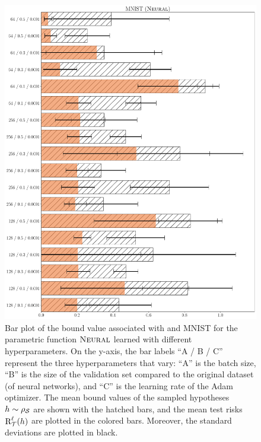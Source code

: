 \documentclass[twoside]{article}
\theoremstyle{plain}
\begin{document}
\begin{figure}
\centering
\includegraphics[width=0.9\linewidth]{figures/fig_7_mnist.pdf}
\caption{
Bar plot of the bound value associated with  and MNIST for the parametric function $\text{\sc Neural}$ learned with different hyperparameters.
On the y-axis, the bar labels ``A / B / C'' represent the three hyperparameters that vary: ``A'' is the batch size, ``B'' is the size of the validation set compared to the original dataset (of neural networks), and ``C'' is the learning rate of the Adam optimizer.
The mean bound values of the sampled hypotheses $h\sim\rho_{\mathcal{S}}$ are shown with the hatched bars, and the mean test risks $\text{R}^{\ell}_{\mathcal{T}}(h)$ are plotted in the colored bars.
Moreover, the standard deviations are plotted in black.
}
\label{fig:neural-mnist}
\end{figure}
\end{document}

